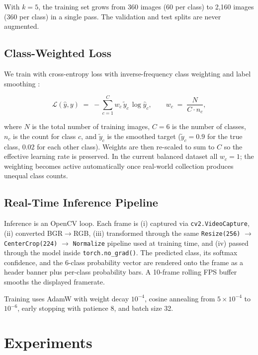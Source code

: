 \documentclass{article}
\begin{document}
With $k=5$, the training set grows from 360 images (60 per class) to 2{,}160
images (360 per class) in a single pass. The validation and test splits are
never augmented.

\subsection{Class-Weighted Loss}
\label{sec:method-loss}

We train with cross-entropy loss with inverse-frequency class weighting and
label smoothing \citep{szegedy2016rethinking}:

\begin{equation}
\mathcal{L}(\hat{y}, y) \;=\; -\sum_{c=1}^{C} w_c \,\tilde{y}_c \,\log \hat{y}_c,
\qquad
w_c \;=\; \frac{N}{C \cdot n_c},
\end{equation}

where $N$ is the total number of training images, $C=6$ is the number of
classes, $n_c$ is the count for class $c$, and $\tilde{y}_c$ is the smoothed
target ($\tilde{y}_c = 0.9$ for the true class, $0.02$ for each other class).
Weights are then re-scaled to sum to $C$ so the effective learning rate
is preserved. In the current balanced dataset all $w_c = 1$; the weighting
becomes active automatically once real-world collection produces unequal
class counts.

\subsection{Real-Time Inference Pipeline}
\label{sec:method-inference}

Inference is an OpenCV loop. Each frame is (i) captured via
\texttt{cv2.VideoCapture}, (ii) converted BGR$\rightarrow$RGB, (iii) transformed
through the same \texttt{Resize(256)} $\rightarrow$ \texttt{CenterCrop(224)}
$\rightarrow$ \texttt{Normalize} pipeline used at training time, and (iv) passed
through the model inside \texttt{torch.no\_grad()}. The predicted class, its
softmax confidence, and the 6-class probability vector are rendered onto
the frame as a header banner plus per-class probability bars.
A 10-frame rolling FPS buffer smooths the displayed framerate.

Training uses AdamW \citep{loshchilov2019decoupled} with weight decay
$10^{-4}$, cosine annealing \citep{loshchilov2017sgdr} from $5\times10^{-4}$ to
$10^{-6}$, early stopping with patience 8, and batch size 32.

\section{Experiments}
\label{sec:experiments}
\end{document}
